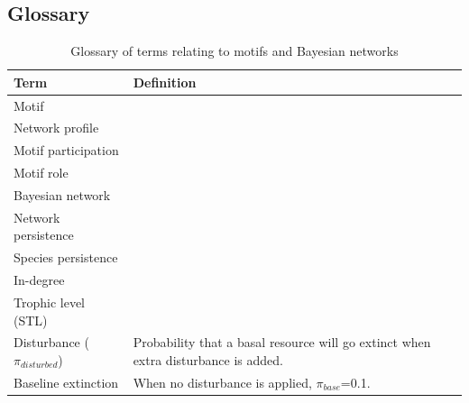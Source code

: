 \documentclass[12pt]{article}
\begin{document}
\begin{spacing}{2.0}
    

\section*{Glossary}

\begin{table}[h!]
\label{glossary}
\caption{Glossary of terms relating to motifs and Bayesian networks}

\begin{tabular}{l|l}
    Term & Definition \\
    \hline
    Motif &  \\
    Network profile & \\
    Motif participation & \\
    Motif role & \\
    Bayesian network & \\
    Network persistence & \\
    Species persistence & \\
    In-degree & \\
    Trophic level (STL) & \\
    Disturbance ($\pi_{disturbed}$) & Probability that a basal resource will go extinct when extra disturbance is added. \\
    Baseline extinction&  When no disturbance is applied, $\pi_{base}$=0.1.\\
\end{tabular}
\end{table}



 

\end{spacing}
\end{document}

